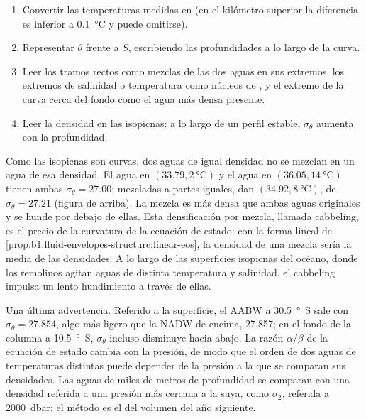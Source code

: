 \begin{method}\label{met:b1:fluid-envelopes-structure:ts}
\begin{enumerate}
  \item Convertir las temperaturas medidas en  (en el kilómetro superior la diferencia es inferior a \qty{0.1}{\celsius} y puede omitirse).
  \item Representar $\theta$ frente a $S$, escribiendo las profundidades a lo largo de la curva.
  \item Leer los tramos rectos como mezclas de las dos aguas en sus extremos, los extremos de salinidad o temperatura como núcleos de , y el extremo de la curva cerca del fondo como el agua más densa presente.
  \item Leer la densidad en las isopicnas: a lo largo de un perfil estable, $\sigma_\theta$ aumenta con la profundidad.
\end{enumerate}
\end{method}

Como las isopicnas son curvas, dos aguas de igual densidad no se mezclan en un agua de esa densidad. El agua en $(33.79, \qty{2}{\celsius})$ y el agua en
$(36.05, \qty{14}{\celsius})$ tienen ambas $\sigma_\theta = 27.00$; mezcladas a partes iguales, dan $(34.92, \qty{8}{\celsius})$, de $\sigma_\theta = 27.21$
(figura de arriba). La mezcla es más densa que ambas aguas originales y se hunde por debajo de ellas. Esta densificación por mezcla, llamada cabbeling, es el precio de la curvatura de la ecuación de estado: con la forma lineal de
\cref{prop:b1:fluid-envelopes-structure:linear-eos}, la densidad de una mezcla sería la media de las densidades. A lo largo de las superficies isopicnas del océano, donde los remolinos agitan aguas de distinta temperatura y salinidad, el cabbeling impulsa un lento hundimiento a través de ellas.

Una última advertencia. Referido a la superficie, el AABW a \qty{30.5}{\degree S} sale con $\sigma_\theta = 27.854$, algo más ligero que la NADW de encima,
\num{27.857}; en el fondo de la columna a \qty{10.5}{\degree S}, $\sigma_\theta$ incluso disminuye hacia abajo. La razón $\alpha/\beta$ de la ecuación de estado cambia con la presión, de modo que el orden de dos aguas de temperaturas distintas puede depender de la presión a la que se comparan sus densidades. Las aguas de miles de metros de profundidad se comparan con una densidad referida a una presión más cercana a la suya, como $\sigma_2$, referida a \qty{2000}{dbar}; el método es el del volumen del año siguiente.

